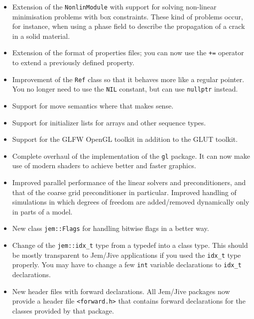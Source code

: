 \documentclass[a4paper]{article}
\newcommand{\Code}[1]{\texttt{#1}}
\begin{document}
\begin{itemize}

  \item Extension of the \Code{NonlinModule} with support for solving
    non-linear minimisation problems with box constraints. These kind of
    problems occur, for instance, when using a phase field to describe
    the propagation of a crack in a solid material.

  \item Extension of the format of properties files; you can now use the
    \Code{+=} operator to extend a previously defined property.

  \item Improvement of the \Code{Ref} class so that it behaves more like
    a regular pointer. You no longer need to use the \Code{NIL} constant,
    but can use \Code{nullptr} instead.

  \item Support for move semantics where that makes sense.

  \item Support for initializer lists for arrays and other sequence
    types.

  \item Support for the GLFW OpenGL toolkit in addition to the GLUT
    toolkit.

  \item Complete overhaul of the implementation of the \Code{gl} package.
    It can now make use of modern shaders to achieve better and faster
    graphics.

  \item Improved parallel performance of the linear solvers and
    preconditioners, and that of the coarse grid preconditioner in
    particular. Improved handling of simulations in which degrees of
    freedom are added/removed dynamically only in parts of a model.

  \item New class \Code{jem::Flags} for handling bitwise flags in a
    better way.

  \item Change of the \Code{jem::idx\_t} type from a typedef into a class
    type. This should be mostly transparent to Jem/Jive applications if
    you used the \Code{idx\_t} type properly. You may have to change a
    few \Code{int} variable declarations to \Code{idx\_t} declarations.

  \item New header files with forward declarations. All Jem/Jive packages
    now provide a header file \Code{<forward.h>} that contains forward
    declarations for the classes provided by that package.


\end{itemize}
\end{document}
